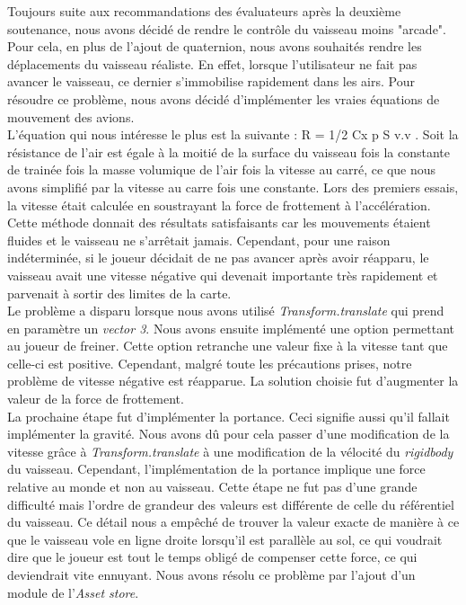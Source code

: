 \documentclass[12pt, titlepage]{article}
\begin{document}
\begin{spacing}{1.5}
Toujours suite aux recommandations des évaluateurs après la deuxième soutenance, nous avons décidé de rendre le contrôle du vaisseau moins "arcade". Pour cela, en plus de l'ajout de quaternion, nous avons souhaités rendre les déplacements du vaisseau réaliste. En effet, lorsque l'utilisateur ne fait pas avancer le vaisseau, ce dernier s'immobilise rapidement dans les airs. Pour résoudre ce problème, nous avons décidé d'implémenter les vraies équations de mouvement des avions.\\

L'équation qui nous intéresse le plus est la suivante : R = 1/2 Cx p S v.v . Soit la résistance de l'air est égale à la moitié de la surface du vaisseau fois la constante de trainée fois la masse volumique de l'air fois la vitesse au carré, ce que nous avons simplifié par la vitesse au carre fois une constante. Lors des premiers essais, la vitesse était calculée en soustrayant la force de frottement à l'accélération. Cette méthode donnait des résultats satisfaisants car les mouvements étaient fluides et le vaisseau ne s'arrêtait jamais. Cependant, pour une raison indéterminée, si le joueur décidait de ne pas avancer après avoir réapparu, le vaisseau avait une vitesse négative qui devenait importante très rapidement et parvenait à sortir des limites de la carte. \\

Le problème a disparu lorsque nous avons utilisé \textit{Transform.translate} qui prend en paramètre un \textit{vector 3}. Nous avons ensuite implémenté une option permettant au joueur de freiner. Cette option retranche une valeur fixe à la vitesse tant que celle-ci est positive. Cependant, malgré toute les précautions prises, notre problème de vitesse négative est réapparue. La solution choisie fut d'augmenter la valeur de la force de frottement. \\

La prochaine étape fut d'implémenter la portance. Ceci signifie aussi qu’il fallait implémenter la gravité. Nous avons dû pour cela passer d’une modification de la vitesse grâce à \textit{Transform.translate} à une modification de la vélocité du \textit{rigidbody} du vaisseau. Cependant, l'implémentation de la portance implique une force relative au monde et non au vaisseau. Cette étape ne fut pas d’une grande difficulté mais l'ordre de grandeur des valeurs est différente de celle du référentiel du vaisseau. Ce détail nous a empêché de trouver la valeur exacte de manière à ce que le vaisseau vole en ligne droite lorsqu'il est parallèle au sol, ce qui voudrait dire que le joueur est tout le temps obligé de compenser cette force, ce qui deviendrait vite ennuyant. Nous avons résolu ce problème par l'ajout d'un module de l'\textit{Asset store}.\\


\end{spacing}
\end{document}
